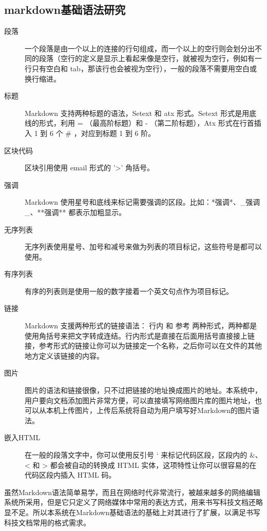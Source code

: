 \subsection{markdown基础语法研究}
\label{sec:markdownbase}

\begin{description}
\item[段落] 一个段落是由一个以上的连接的行句组成，而一个以上的空行则会划分出不同的段落（空行的定义是显示上看起来像是空行，就被视为空行，例如有一行只有空白和 tab，那该行也会被视为空行），一般的段落不需要用空白或换行缩进。
\item[标题] Markdown 支持两种标题的语法，Setext 和 atx 形式。Setext 形式是用底线的形式，利用 = （最高阶标题）和 - （第二阶标题），Atx 形式在行首插入 1 到 6 个 \# ，对应到标题 1 到 6 阶。
\item[区块代码] 区块引用使用 email 形式的 '>' 角括号。
\item[强调] Markdown 使用星号和底线来标记需要强调的区段。比如：*强调*、\_强调\_、**强调** 都表示加粗显示。
\item[无序列表] 无序列表使用星号、加号和减号来做为列表的项目标记，这些符号是都可以使用。
\item[有序列表] 有序的列表则是使用一般的数字接着一个英文句点作为项目标记。
\item[链接] Markdown 支援两种形式的链接语法： 行内 和 参考 两种形式，两种都是使用角括号来把文字转成连结。行内形式是直接在后面用括号直接接上链接，参考形式的链接让你可以为链接定一个名称，之后你可以在文件的其他地方定义该链接的内容。
\item[图片] 图片的语法和链接很像，只不过把链接的地址换成图片的地址。本系统中，用户要向文档添加图片非常方便，可以直接填写网络图片库的图片地址，也可以从本机上传图片，上传后系统将自动为用户填写好Markdown的图片语法。
\item[嵌入HTML] 在一般的段落文字中，你可以使用反引号 ` 来标记代码区段，区段内的 \&、< 和 > 都会被自动的转换成 HTML 实体，这项特性让你可以很容易的在代码区段内插入 HTML 码。
\end{description}
虽然Markdown语法简单易学，而且在网络时代非常流行，被越来越多的网络编辑系统所采用，但是它只定义了网络媒体中常用的表达方式，用来书写科技文档还略显不足。所以本系统在Markdown基础语法的基础上对其进行了扩展，以满足书写科技文档常用的格式需求。

\subsection{}
\label{sec:smarkdownextr}


